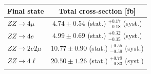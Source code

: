 \begin{table}[htbH]
\begin{center}
\begin{tabular}{lc}
\hline Final state & Total cross-section [fb]\\
\hline $ZZ\to 4\mu $ & $4.74\pm 0.54$ (stat.) $^{+0.17}_{-0.18}$ (syst.)\\
$ZZ\to 4e $ &  $4.99\pm 0.69$ (stat.) $^{+0.32}_{-0.35}$ (syst.)\\
$ZZ\to 2e2\mu$ & $10.77\pm 0.90$ (stat.) $^{+0.55}_{-0.59}$ (syst.)\\
\hline
\textbf{$ZZ\to 4\ell$} &  $20.50\pm 1.26$ (stat.) $^{+0.79}_{-0.83}$ (syst.)\\
\hline \\
\end{tabular}
\end{center}
\end{table}


